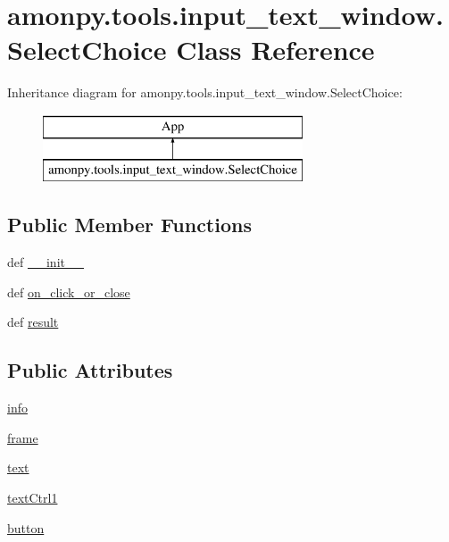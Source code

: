 \hypertarget{classamonpy_1_1tools_1_1input__text__window_1_1_select_choice}{\section{amonpy.\-tools.\-input\-\_\-text\-\_\-window.\-Select\-Choice Class Reference}
\label{classamonpy_1_1tools_1_1input__text__window_1_1_select_choice}
}
Inheritance diagram for amonpy.\-tools.\-input\-\_\-text\-\_\-window.\-Select\-Choice\-:\begin{figure}[H]
\begin{center}
\leavevmode
\includegraphics[height=2.000000cm]{classamonpy_1_1tools_1_1input__text__window_1_1_select_choice}
\end{center}
\end{figure}
\subsection*{Public Member Functions}
\begin{DoxyCompactItemize}
\item 
def \hyperlink{classamonpy_1_1tools_1_1input__text__window_1_1_select_choice_aedbd4663dd0e28caf001585c390072ca}{\-\_\-\-\_\-init\-\_\-\-\_\-}
\item 
def \hyperlink{classamonpy_1_1tools_1_1input__text__window_1_1_select_choice_a46b3d909cca619c1489e4d1f4080e36a}{on\-\_\-click\-\_\-or\-\_\-close}
\item 
def \hyperlink{classamonpy_1_1tools_1_1input__text__window_1_1_select_choice_a847223a6204d1851aedcde1c2b88cccf}{result}
\end{DoxyCompactItemize}
\subsection*{Public Attributes}
\begin{DoxyCompactItemize}
\item 
\hyperlink{classamonpy_1_1tools_1_1input__text__window_1_1_select_choice_aa47ee685de6c28e23b244fdae0eaad87}{info}
\item 
\hyperlink{classamonpy_1_1tools_1_1input__text__window_1_1_select_choice_aee9b6e27856594efa52216a82b62521e}{frame}
\item 
\hyperlink{classamonpy_1_1tools_1_1input__text__window_1_1_select_choice_a6983cf49c1516c4653cad8e3663dbb38}{text}
\item 
\hyperlink{classamonpy_1_1tools_1_1input__text__window_1_1_select_choice_aab6b0771ae4ce1d7f51e5a7cd8cb3c3d}{text\-Ctrl1}
\item 
\hyperlink{classamonpy_1_1tools_1_1input__text__window_1_1_select_choice_acc99d030bfd068e7f24d6d77f5c5c767}{button}
\end{DoxyCompactItemize}


